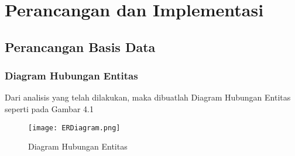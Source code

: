 \chapter{Perancangan dan Implementasi}
\label{chap:perancanganDanImplementasi}
\setcounter{secnumdepth}{3}
\section{Perancangan Basis Data}
\subsection{Diagram Hubungan Entitas}
Dari analisis yang telah dilakukan, maka dibuatlah Diagram Hubungan Entitas seperti pada Gambar 4.1
\begin{figure} [H]
	\centering  
	\texttt{[image: ERDiagram.png]}  
	\caption[Diagram Hubungan Entitas]{Diagram Hubungan Entitas} 
	\label{fig:skematik-phpexcel} 
\end{figure}

